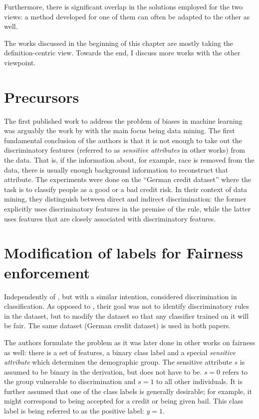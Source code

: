 Furthermore, there is significant overlap in the solutions employed for the two views:
a method developed for one of them can often be adapted to the other as well.

The works discussed in the beginning of this chapter are mostly taking the definition-centric view.
Towards the end, I discuss more works with the other viewpoint.

\section{Precursors}\label{precursor}
The first published work to address the problem of biases in machine learning
was arguably the work by \citet{pedreshi2008discrimination}
with the main focus being data mining.
The first fundamental conclusion of the authors
is that it is not enough to take out the discriminatory features
(referred to as \emph{sensitive attributes} in other works) from the data.
That is, if the information about, for example, race
is removed from the data,
there is usually enough background information to reconstruct that attribute.
The experiments were done on the ``German credit dataset''
where the task is to classify people as a good or a bad credit risk.
In their context of data mining,
they distinguish between direct and indirect discrimination:
the former explicitly uses discriminatory features in the premise of the rule,
while the latter uses features that are closely associated with discriminatory features.

\section{Modification of labels for Fairness enforcement}\label{modification-of-labels-for-fairness-enforcement}
Independently of \citet{pedreshi2008discrimination}, but with a similar intention,
\citet{kamiran2009classifying} considered discrimination in classification.
As opposed to \citet{pedreshi2008discrimination}, their goal was not to identify discriminatory rules in the dataset,
but to modify the dataset so that any classifier trained on it will be fair.
The same dataset (German credit dataset) is used in both papers.

The authors formulate the problem as it was later done in other works on fairness as well:
there is a set of features, a binary class label
and a special \emph{sensitive attribute} which determines the demographic group.
The sensitive attribute \(s\) is assumed to be binary in the derivation,
but does not have to be.
\(s=0\) refers to the group vulnerable to discrimination and \(s=1\) to all other individuals.
It is further assumed that one of the class labels is generally desirable;
for example, it might correspond to being accepted for a credit or being given bail.
This class label is being referred to as the positive label: \(y = 1\).

